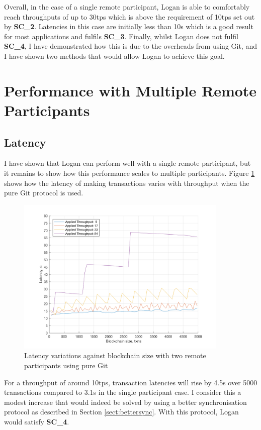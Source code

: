 \documentclass[12pt,a4paper,twoside,openright]{report}
\begin{document}
	Overall, in the case of a single remote participant, Logan is able to comfortably reach throughputs of up to 30tps which is above the requirement of 10tps set out by \textbf{SC\_2}. 
	Latencies in this case are initially less than 10s which is a good result for most applications and fulfils \textbf{SC\_3}.
	Finally, whilst Logan does not fulfil \textbf{SC\_4}, I have demonstrated how this is due to the overheads from using Git, and I have shown two methods that would allow Logan to achieve this goal.

	\section{Performance with Multiple Remote Participants}
	\subsection{Latency}
	I have shown that Logan can perform well with a single remote participant, but it remains to show how this performance scales to multiple participants. 
	Figure \ref{figs:tworems} shows how the latency of making transactions varies with throughput when the pure Git protocol is used.
	\begin{figure}
		\centering
		\includegraphics[width=0.9\textwidth]{figs/2latencies_sizes_throughputs.png}
		\caption{Latency variations against blockchain size with two remote participants using pure Git}
		\label{figs:tworems}
	\end{figure}
	For a throughput of around 10tps, transaction latencies will rise by 4.5s over 5000 transactions compared to 3.1s in the single participant case.
	I consider this a modest increase that would indeed be solved by using a better synchronisation protocol as described in Section \ref{sect:bettersync}. 
	With this protocol, Logan would satisfy \textbf{SC\_4}. \\
\end{document}

